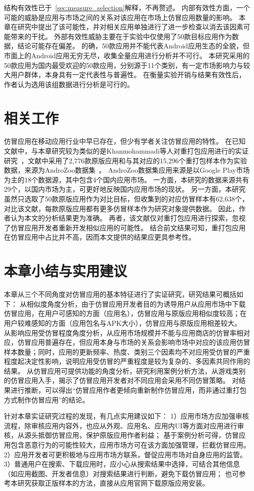 结构有效性已于~\autoref{sec:measure_selection}解释，不再赘述。
内部有效性方面，一个可能的威胁是应用与市场之间的关系对该应用在市场上仿冒应用数量的影响。
本章在研究中提出了该可能性，并对相关应用单独进行了进一步检查以消去该因素可能带来的干扰。
外部有效性威胁主要在于实验中仅使用了50款目标应用作为数据，结论可能存在偏差。
的确，50款应用并不能代表Android应用生态的全貌，但市面上的Android应用无穷无尽，收集全量应用进行分析并不可行。
本研究采用的50款应用为国内最受欢迎的50款应用，分别源于11个类别，有一定市场影响力与较大用户群体，本身具有一定代表性与普遍性。
在衡量实验开销与结果有效性后，作者认为选用该组数据进行分析是可行的。

\section{相关工作}

仿冒应用在移动应用行业中早已存在，但少有学者关注仿冒应用的特性。
在已知文献中，与本章研究较为类似的是Khanmohammadi等人对重打包应用进行的实证研究~\cite{khanmohammadi2019empirical}，文献中采用了2,776款原版应用和与其对应的15,296个重打包样本作为实验数据，来源为AndroZoo数据集~\cite{li2017androzoo++}。
AndroZoo数据集应用来源是以Google Play市场为主的18个数据源，其中包含4个国内应用市场。
一方面，本研究的数据来源共有29个，以国内市场为主，可更好地反映国内应用市场的现状。
另一方面，本研究虽然只选取了50款原版应用作为对比目标，但收集到的对应仿冒样本有62,638个，对比该文献，每款原版应用都有更多仿冒样本作为研究对象提供数据。
因此，作者认为本文的分析结果更为准确。
再者，该文献仅对重打包应用进行探索，忽视了仿冒应用开发者重新开发相似应用的可能性。
结合前文结果可知，重打包应用在仿冒应用中占比并不高，因而本文提供的结果应更具参考性。


\section{本章小结与实用建议}

本章从三个不同角度对仿冒应用的基本特征进行了实证研究，研究结果可概括如下：
从相似度角度分析，由于仿冒应用开发者目的为诱导用户从应用市场中下载仿冒应用，在用户可感知的方面（应用名），仿冒应用与原版应用相似度较高；在用户较难感知的方面（应用包名与APK大小），仿冒应用与原版应用相差较大。
从影响应用受仿冒程度角度分析，从应用市场规模并不能与应用商店的仿冒率相对应，仿冒应用普遍存在，但应用本身与市场的关系会影响市场中对应的该应用仿冒样本数量；同时，应用的更新频率、热度、类别三个因素均不对应用受仿冒的严重程度起决定性影响，说明应用受仿冒的严重程度是较为复杂的、多因素共同作用的结果。
从仿冒应用可提供功能的角度分析，研究利用案例分析方法，从游戏类别的仿冒应用入手，揭示了仿冒应用开发者对不同应用会采用不同仿冒策略。
对结果进行推断，可以得出``仿冒应用作者更倾向重新制作仿冒应用，而非通过重打包方式制作仿冒应用''的结论。

针对本章实证研究过程的发现，有几点实用建议如下：
1）应用市场方应加强审核流程，除审核应用内容外，也应从外观、应用名、应用内UI等方面对应用进行审核，从源头抵御仿冒应用，保护原版应用作者利益；
基于案例分析可得，仿冒应用包含恶意行为的可能性较大，应用市场方可在该方面加强管理，拦截仿冒应用。
2）应用开发者可更积极地与应用市场方联系，督促应用市场对自身应用的监管。
3）普通用户在搜索、下载应用时，应小心从搜索结果中选择，可结合其他信息（如应用截图、开发者信息）对搜索结果进行判断，避免下载仿冒应用；
也可参考本研究获取正版样本的方法，直接从应用官网下载原版应用安装。
